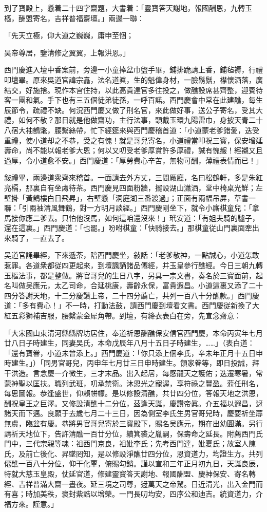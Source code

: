到了寶殿上，懸着二十四字齋題，大書着：「靈寳答天謝地，報國酬恩，九轉玉樞，酬盟寄名，吉祥普福齋壇。」兩邊一聯：

「先天立極，仰大道之巍巍，庸申至悃；

昊帝尊居，鑒清修之翼翼，上報洪恩。」

西門慶進入壇中香案前，旁邊一小童捧盆巾盥手畢，鋪排跪請上香，鋪毡褥，行禮叩壇畢。原來吳道官諱宗嚞，法名道眞，生的魁偉身材，一臉鬍鬚，襟懷洒落，廣結交，好施捨。現作本宫住持，以此高貴達官多往投之，做醮設席甚齊整，迎賓待客一團和氣。手下也有三五個徒弟徒孫，一呼百諾。西門慶會中常在此建醮，每生辰節令，疏禮不缺。何況西門慶又做了刑名官，來此做好事，送公子寄名，受其大禮，如何不敬？那日就是他做齋功，主行法事，頭戴玉環九陽雷巾，身披天青二十八宿大袖鶴氅，腰繫絲帶，忙下經筵來與西門慶稽首道：「小道蒙老爹錯愛，迭受重禮，使小道却之不恭，受之有愧！就是哥兒寄名，小道禮當叩祝三寳，保安增延壽命，尚不能以報老爹大恩；何以又叨受老爹厚賞許多厚禮，誠有愧赧！經襯又且過厚，令小道愈不安。」西門慶道：「厚勞費心辛苦，無物可酬，薄禮表情而已！」

敍禮畢，兩邊道衆齊來稽首。一面請去外方丈，三間厰廳，名曰松鶴軒，多是朱紅亮槅，那裏自有坐䖏待茶。西門慶見四面粉牆，擺設湖山瀟洒，堂中椅桌光鮮；左壁掛「黃鶴樓白日飛昇」，右壁懸「洞庭湖三番渡過」；正面有兩幅吊屏，草書一聯：「引兩袖清風舞鶴，對一方明月談經。」西門慶剛坐下，就令小廝棋童兒：「拿馬接你應二爹去。只怕他沒馬，如何這咱還沒來！」玳安道：「有姐夫騎的驢子，還在這裏。」西門慶道：「也罷。」吩咐棋童：「快騎接去。」那棋童従山門裏面牽出來騎了，一直去了。

吴道官誦畢經，下來遞茶，陪西門慶坐，敍話：「老爹敬神，一點誠心，小道怎敢惹罪。各道衆都従四更起來，到壇諷誦諸品僊經，并玉皇參行醮經。今日三朝九轉玉樞法事，都是整做。將官哥兒的生日八字，另具一宗文書，奏名於三寶面前，起名叫做吴應元，太乙司命，合延桃康，壽齡永保，富貴遐昌。小道這裏又添了二十四分答謝天地，十二分慶讚上帝，二十四分薦亡，共列一百八十分醮款。」西門慶道：「多有費心！」不一時，打動法鼓，請西門慶到壇看文書。西門慶従新換了大紅五彩獅補吉服，腰繫蒙金犀角帶。到壇，有絳衣表白在旁，先宣念齋意：

「大宋國山東清河縣縣牌坊居住，奉道祈恩酬醮保安信官西門慶，本命丙寅年七月廿八日子時建生，同妻吴氏，本命戊辰年八月十五日子時建生，……」（表白道：「還有寶眷，小道未曾添上。」西門慶道：「你只添上個李氏，辛未年正月十五日申時建生。」）「同男官哥兒，丙申年七月廿三日申時建生。領家眷等，即日投誠，拜干洪造。言念慶一介微生，三才末品。出入起居，每感龍天之護佑；迭遷寒暑，常蒙神聖以匡扶。職列武班，叨承禁衛。沐恩光之寵渥，享符祿之豐盈。蒞任刑名，每思圖報。恭逢盛世，仰賴帡幪。是以修設清醮，共廿四分位，答報天地之洪恩，酬祝皇王之巨澤。又修設清醮十二分位，茲逢天誕，慶讚帝眞。介五福以遐昌，迓諸天而下邁。良願于去歲七月二十三日，因為側室李氏生男官哥兒時，慶要祈坐蓐無虞，臨盆有慶。恭將男官哥兒寄於三寳殿下，賜名吴應元，期在出幼圓滿。另行請祈天地位下，告許清醮一百廿分位，續箕裘之胤嗣，保壽命之延長。附薦西門氏門中，三代宗親等魂：祖西門京良，祖妣李氏；先考西門達，妣夏氏；故室人陳氏，及前亡後化、昇墜罔知，是以修設淨醮廿四分位，恩資道力，均證生方。共列僊醮一百八十分位，仰干化覃，俯賜勾銷。謹以宣和三年正月初九日，天誕良辰，特就大慈玉皇殿，仗延官道，修建靈寳答天謝地、報國酬盟、慶神保安、寄名轉經、吉祥普滿大齋一晝夜。延三境之司尊，迓萬天之帝駕。日近清光，出入金門而有喜；時加美秩，褒封紫誥以增榮。一門長叨均安，四序公和迪吉。統資道力，介福方來。謹意。」

